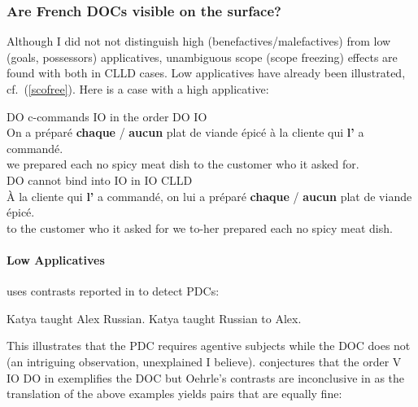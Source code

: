 \documentclass[output=paper]{langsci/langscibook}
\begin{document}
\subsubsection{Are French \glspl{DOC} visible on the surface?}

Although I did not not distinguish high (benefactives/malefactives) from low
(goals, possessors) applicatives, unambiguous scope (scope freezing) effects
are found with both in \gls{CLLD} cases. Low
applicatives have already been illustrated, cf.\ (\ref{scofree}). Here is a
case with a high applicative:

\ea\label{doio6}
    \ea DO c-commands IO in the order DO IO\\
    \gll {}On {a pr\'{e}par\'{e}} \textbf{chaque} / \textbf{aucun} {plat
    de viande \'epic\'e} \`{a} la cliente qui {\bf l'} {a command\'e}.\\
     we prepared each {} no {spicy meat dish}  to the customer who it {asked for}.\\
    \ex DO cannot bind into IO in IO CLLD\\
    \gll \llap{*}À la cliente qui \textbf{l'} {a commandé}, on lui a  préparé
        \textbf{chaque} / \textbf{aucun} {plat de viande épicé}.\\
         to the customer who it {asked for} we to-her {} prepared each {} no
        {spicy meat dish}.\\
\z
\z

\paragraph*{Low Applicatives}

\cite{anagnostopoulou2005cross} uses contrasts reported in \cite{Oehrle:1976}
to detect \glspl{PDC}:

\ea
    \z
\z

\ea \ea Katya taught Alex Russian.
\ex Katya taught Russian to Alex.
\z
\z

\ea
{}
\z
\z

This illustrates that the \gls{PDC}
requires agentive subjects while the \gls{DOC} does not (an intriguing
observation, unexplained  I believe).  \cite{anagnostopoulou2005cross}
conjectures that the order V IO DO in  exemplifies the
\gls{DOC} but Oehrle's contrasts are
inconclusive in  as the translation of the above examples yields pairs
that are equally fine:
\end{document}
